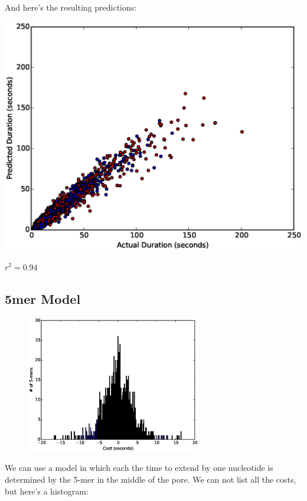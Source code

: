         \vspace{1.5in}

        And here's the resulting predictions:
        
\includegraphics[width=\textwidth]{part11scatter4mer}

$r^2=0.94$


        \newpage
        \subsection*{5mer Model}
        \begin{figure}
        \vspace{-50pt}
        \includegraphics[width=3in]{part11hist5}
        \vspace{-70pt}
        \end{figure}
        We can use a model in which each the time to extend by one nucleotide is determined by the 5-mer in the middle of the
        pore.  We can not list all the costs, but here's a histogram:

